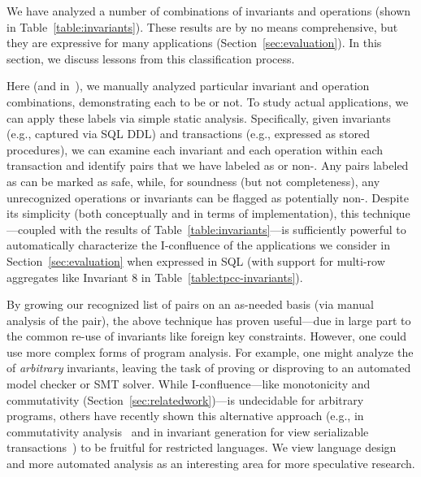 We have analyzed a number of combinations of invariants and operations
(shown in Table~\ref{table:invariants}). These results are by no
means comprehensive, but they are expressive for many applications
(Section~\ref{sec:evaluation}). In this section, we discuss lessons from this
classification process.

 Here (and in~\rappendix{\appapply}), we
manually analyzed particular invariant and operation combinations,
demonstrating each to be \iconfluent or not. To study actual
applications, we can apply these labels via simple static
analysis. Specifically, given invariants (e.g., captured via SQL DDL)
and transactions (e.g., expressed as stored procedures), we can
examine each invariant and each operation within each transaction and
identify pairs that we have labeled as \iconfluent or
non-\iconfluent. Any pairs labeled as \iconfluent can be marked as
safe, while, for soundness (but not completeness), any unrecognized
operations or invariants can be flagged as potentially
non-\iconfluent. Despite its simplicity (both conceptually and in
terms of implementation), this technique---coupled with the results of
Table~\ref{table:invariants}---is sufficiently powerful to
automatically characterize the I-confluence of the applications we
consider in Section~\ref{sec:evaluation} when expressed in SQL (with
support for multi-row aggregates like Invariant 8 in
Table~\ref{table:tpcc-invariants}).

By growing our recognized list of \iconfluent pairs on an as-needed
basis (via manual analysis of the pair), the above technique has
proven useful---due in large part to the common re-use of invariants
like foreign key constraints. However, one could use more complex
forms of program analysis. For example, one might analyze the
\iconfluence of \textit{arbitrary} invariants, leaving the task of
proving or disproving \iconfluence to an automated model checker or
SMT solver. While I-confluence---like monotonicity and commutativity
(Section~\ref{sec:relatedwork})---is undecidable for arbitrary
programs, others have recently shown this alternative approach (e.g.,
in commutativity analysis~\cite{kohler-commutativity,redblue-new} and
in invariant generation for view serializable
transactions~\cite{writes-forest}) to be fruitful for restricted
languages. We view language design and more automated analysis as an
interesting area for more speculative research.

